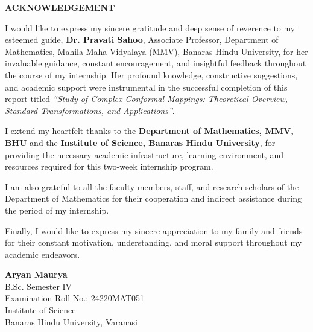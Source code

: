 \documentclass[12pt,a4paper]{article}
\begin{document}
\vspace*{0.5cm}

\begin{center}
    {\Large \textbf{ACKNOWLEDGEMENT}}
\end{center}

\vspace{0.8cm}


I would like to express my sincere gratitude and deep sense of reverence to my esteemed guide, \textbf{Dr. Pravati Sahoo}, Associate Professor, Department of Mathematics, Mahila Maha Vidyalaya (MMV), Banaras Hindu University, for her invaluable guidance, constant encouragement, and insightful feedback throughout the course of my internship. Her profound knowledge, constructive suggestions, and academic support were instrumental in the successful completion of this report titled \textit{“Study of Complex Conformal Mappings: Theoretical Overview, Standard Transformations, and Applications”}.

I extend my heartfelt thanks to the \textbf{Department of Mathematics, MMV, BHU} and the \textbf{Institute of Science, Banaras Hindu University}, for providing the necessary academic infrastructure, learning environment, and resources required for this two-week internship program.

I am also grateful to all the faculty members, staff, and research scholars of the Department of Mathematics for their cooperation and indirect assistance during the period of my internship.

Finally, I would like to express my sincere appreciation to my family and friends for their constant motivation, understanding, and moral support throughout my academic endeavors.

\vspace{1.5cm}

\begin{flushright}
    \textbf{Aryan Maurya}\\
    B.Sc. Semester IV\\
    Examination Roll No.: 24220MAT051\\
    Institute of Science\\
    Banaras Hindu University, Varanasi
\end{flushright}
\end{document}
